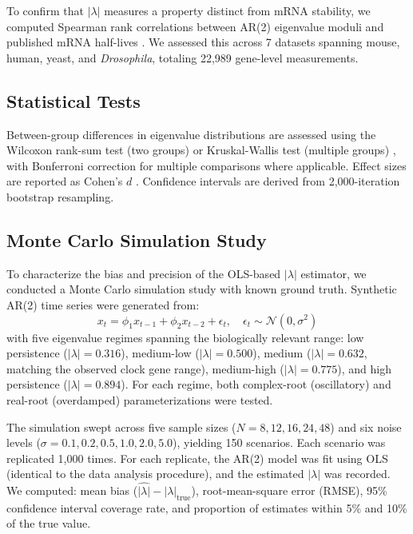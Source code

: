 \documentclass[11pt,letterpaper]{article}
\begin{document}
To confirm that $|\lambda|$ measures a property distinct from mRNA stability, we computed Spearman rank correlations between AR(2) eigenvalue moduli and published mRNA half-lives \citep{rabani2011metabolic, schwanhausser2011global}. We assessed this across 7 datasets spanning mouse, human, yeast, and \textit{Drosophila}, totaling 22,989 gene-level measurements.

\subsection{Statistical Tests}

Between-group differences in eigenvalue distributions are assessed using the Wilcoxon rank-sum test (two groups) or Kruskal-Wallis test (multiple groups) \citep{kruskal1952use}, with Bonferroni correction for multiple comparisons where applicable. Effect sizes are reported as Cohen's $d$ \citep{cohen1988statistical}. Confidence intervals are derived from 2,000-iteration bootstrap resampling.

\subsection{Monte Carlo Simulation Study} \label{sec:montecarlo-methods}

To characterize the bias and precision of the OLS-based $|\lambda|$ estimator, we conducted a Monte Carlo simulation study with known ground truth. Synthetic AR(2) time series were generated from:
\begin{equation}
x_t = \phi_1 x_{t-1} + \phi_2 x_{t-2} + \epsilon_t, \quad \epsilon_t \sim \mathcal{N}(0, \sigma^2)
\end{equation}
with five eigenvalue regimes spanning the biologically relevant range: low persistence ($|\lambda| = 0.316$), medium-low ($|\lambda| = 0.500$), medium ($|\lambda| = 0.632$, matching the observed clock gene range), medium-high ($|\lambda| = 0.775$), and high persistence ($|\lambda| = 0.894$). For each regime, both complex-root (oscillatory) and real-root (overdamped) parameterizations were tested.

The simulation swept across five sample sizes ($N = 8, 12, 16, 24, 48$) and six noise levels ($\sigma = 0.1, 0.2, 0.5, 1.0, 2.0, 5.0$), yielding 150 scenarios. Each scenario was replicated 1,000 times. For each replicate, the AR(2) model was fit using OLS (identical to the data analysis procedure), and the estimated $|\lambda|$ was recorded. We computed: mean bias ($\hat{|\lambda|} - |\lambda|_{\text{true}}$), root-mean-square error (RMSE), 95\% confidence interval coverage rate, and proportion of estimates within 5\% and 10\% of the true value.
\end{document}
